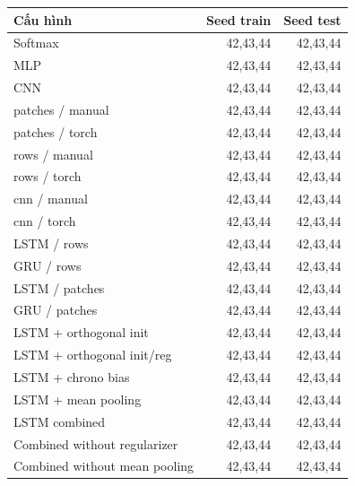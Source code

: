 \begin{longtable}{@{}p{}rr@{}}
\toprule
Cấu hình & Seed train & Seed test \\ \midrule \endhead
Softmax & 42,43,44 & 42,43,44 \\
MLP & 42,43,44 & 42,43,44 \\
CNN & 42,43,44 & 42,43,44 \\
patches / manual & 42,43,44 & 42,43,44 \\
patches / torch & 42,43,44 & 42,43,44 \\
rows / manual & 42,43,44 & 42,43,44 \\
rows / torch & 42,43,44 & 42,43,44 \\
cnn / manual & 42,43,44 & 42,43,44 \\
cnn / torch & 42,43,44 & 42,43,44 \\
LSTM / rows & 42,43,44 & 42,43,44 \\
GRU / rows & 42,43,44 & 42,43,44 \\
LSTM / patches & 42,43,44 & 42,43,44 \\
GRU / patches & 42,43,44 & 42,43,44 \\
LSTM + orthogonal init & 42,43,44 & 42,43,44 \\
LSTM + orthogonal init/reg & 42,43,44 & 42,43,44 \\
LSTM + chrono bias & 42,43,44 & 42,43,44 \\
LSTM + mean pooling & 42,43,44 & 42,43,44 \\
LSTM combined & 42,43,44 & 42,43,44 \\
Combined without regularizer & 42,43,44 & 42,43,44 \\
Combined without mean pooling & 42,43,44 & 42,43,44 \\
\bottomrule
\end{longtable}
